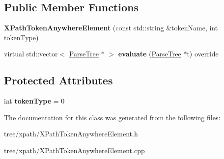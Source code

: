 \subsection*{Public Member Functions}
\begin{DoxyCompactItemize}
\item 
\mbox{\label{classantlr4_1_1tree_1_1xpath_1_1XPathTokenAnywhereElement_abec67824653f97174bf0707add5689f2}} 
{\bfseries X\+Path\+Token\+Anywhere\+Element} (const std\+::string \&token\+Name, int token\+Type)
\item 
\mbox{\label{classantlr4_1_1tree_1_1xpath_1_1XPathTokenAnywhereElement_ae68f3aea754f28490678983947c09e2a}} 
virtual std\+::vector$<$ \hyperlink{classantlr4_1_1tree_1_1ParseTree}{Parse\+Tree} $\ast$ $>$ {\bfseries evaluate} (\hyperlink{classantlr4_1_1tree_1_1ParseTree}{Parse\+Tree} $\ast$t) override
\end{DoxyCompactItemize}
\subsection*{Protected Attributes}
\begin{DoxyCompactItemize}
\item 
\mbox{\label{classantlr4_1_1tree_1_1xpath_1_1XPathTokenAnywhereElement_a65308e838c6f26c1e61504b6a6ca35fc}} 
int {\bfseries token\+Type} = 0
\end{DoxyCompactItemize}


The documentation for this class was generated from the following files\+:\begin{DoxyCompactItemize}
\item 
tree/xpath/X\+Path\+Token\+Anywhere\+Element.\+h\item 
tree/xpath/X\+Path\+Token\+Anywhere\+Element.\+cpp\end{DoxyCompactItemize}

